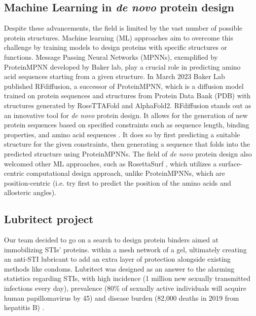 \documentclass[11pt,a4paper]{article}
\begin{document}
\subsection{Machine Learning in \emph{de novo} protein design}

Despite these advancements, the field is limited by the vast number of 
possible protein structures. Machine learning (ML) approaches 
aim to overcome this challenge by training models to design proteins 
with specific structures or functions. Message Passing Neural Networks 
(MPNNs), exemplified by ProteinMPNN \cite{dauparas2022robust} developed 
by Baker lab, play a  crucial role in predicting amino acid sequences 
starting from a given structure.
In March 2023 Baker Lab published RFdiffusion, a successor of 
ProteinMPNN, which is a diffusion model trained on protein sequences and 
structures from Protein Data Bank (PDB) with structures generated by 
RoseTTAFold and AlphaFold2. RFdiffusion stands out as an innovative 
tool for \emph{de novo} protein design. It allows for the generation of new 
protein sequences based on specified constraints such as sequence 
length, binding properties, and amino acid sequences \cite{
watson2023novo}. It does so by first predicting a suitable structure 
for the given constraints, then generating a sequence that folds into 
the predicted structure using ProteinMPNNs.
The field of \emph{de novo} protein design also welcomed other ML approaches, 
such as RosettaSurf \cite{scheck2022rosettasurf}, which utilizes a surface-centric computational design approach,
unlike ProteinMPNNs, which are position-centric (i.e. try first to predict the position of the amino acids and allosteric angles).

\subsection{Lubritect project}

Our team decided to go on a search to design protein binders aimed at immobilizing STIs' proteins.
within a mesh network of a gel, ultimately creating an anti-STI lubricant to add an extra layer of protection alongside 
existing methods like condoms. 
Lubritect was designed
as an answer to the alarming statistics regarding STIs, with high incidence 
(1 million new sexually transmitted infections every day), 
prevalence (80\% of sexually active individuals will acquire human papillomavirus by 45)
and disease burden (82,000 deaths in 2019 from hepatitis B) \cite{paris_bettencourt_project}.
\end{document}
